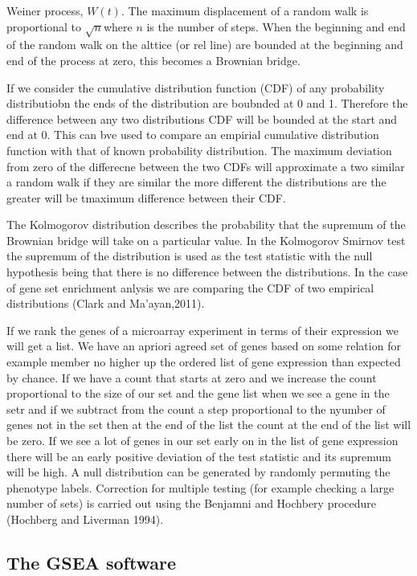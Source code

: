 Weiner process, $W(t)$. The maximum displacement of a random walk is proportional to $\sqrt{n}$where $n$ is the number of steps. When the beginning and end of the random walk on the alttice (or rel line) are bounded at the beginning and end of the process at zero, this becomes a Brownian bridge.

If we consider the cumulative distribution function (CDF) of any probability distributiobn the ends of the distribution are boubnded at 0 and 1. Therefore the difference between any two distributions CDF will be bounded at the start and end at 0. This can bve used to compare an empirial cumulative distribution function with that of known probability distribution. The maximum deviation from zero of the differecne between the two CDFs will approximate a two similar a random walk if they are similar the more different the distributions are the greater will be tmaximum difference between their CDF.

The Kolmogorov distribution describes the probability that the supremum of the Brownian bridge will take on a particular value. In the Kolmogorov Smirnov test the supremum of the distribution is used as the test statistic with the null hypothesis being that there is no difference between the distributions. In the case of gene set enrichment anlysis we are comparing the CDF of two empirical distributions (Clark and Ma'ayan,2011).

If we rank the genes of a microarray experiment in terms of their expression we will get a list. We have an apriori agreed set of genes based on some relation for example member no higher up the ordered list of gene expression than expected by chance. If we have a count that starts at zero and we increase the count proportional to the size of our set and the gene list when we see a gene in the setr and if we subtract from the count a step proportional to the nyumber of genes not in the set then at the end of the list the count at the end of the list will be zero. If we see a lot of genes in our set early on in the list of gene expression there will be an early positive deviation of the test statistic and its supremum will be high. A null distribution can be generated by randomly permuting the phenotype labels. Correction for multiple testing (for example checking a large number of sets) is carried out using the Benjamni and Hochbery procedure (Hochberg and Liverman 1994).

\subsection{The GSEA software}

